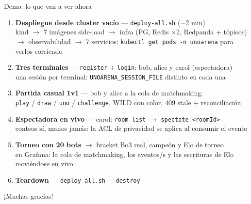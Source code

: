 \documentclass[aspectratio=169,10pt]{beamer}
\begin{document}
\begin{frame}{Demo: lo que van a ver ahora}
  \begin{enumerate}\small
    \item \textbf{Despliegue desde cluster vacío} --- \texttt{deploy-all.sh} ($\sim$2 min)\\
          {\scriptsize kind $\to$ 7 imágenes side-load $\to$ infra (PG, Redis $\times$2, Redpanda + tópicos) $\to$ observabilidad $\to$ 7 servicios;
          \texttt{kubectl get pods -n unoarena} para verlos corriendo}
    \item \textbf{Tres terminales} --- \texttt{register} + \texttt{login}: \alert{bob}, \alert{alice} y \alert{carol} (espectadora)\\
          {\scriptsize una sesión por terminal: \texttt{UNOARENA\_SESSION\_FILE} distinto en cada una}
    \item \textbf{Partida casual 1v1} --- bob y alice a la cola de matchmaking:\\
          {\scriptsize \texttt{play} / \texttt{draw} / \texttt{uno} / \texttt{challenge}, WILD con color, 409 stale + reconciliación}
    \item \textbf{Espectadora en vivo} --- carol: \texttt{room list} $\to$ \texttt{spectate <roomId>}\\
          {\scriptsize conteos sí, manos jamás: la ACL de privacidad se aplica al consumir el evento}
    \item \textbf{Torneo con 20 bots} $\to$ bracket Bo3 real, campeón y Elo de torneo\\
          {\scriptsize en Grafana: la cola de matchmaking, los eventos/s y las escrituras de Elo moviéndose en vivo}
    \item \textbf{Teardown} --- \texttt{deploy-all.sh -{}-destroy}
  \end{enumerate}
\end{frame}

\begin{frame}[standout]
  ¡Muchas gracias!
\end{frame}
\end{document}
